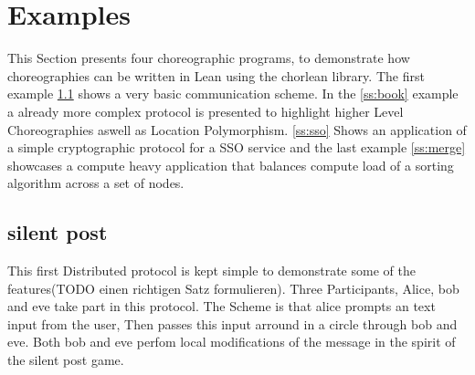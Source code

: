 \begin{lstlisting}[language=lean]
\end{lstlisting}


\section{Examples}

This Section presents four choreographic programs, to demonstrate how choreographies can be written in Lean using the chorlean library. The first example \ref{ss:silent} shows a very basic communication scheme. In the \ref{ss:book} example a already more complex protocol is presented to highlight higher Level Choreographies aswell as Location Polymorphism. \ref{ss:sso} Shows an application of a simple cryptographic protocol for a SSO service and the last example \ref{ss:merge} showcases a compute heavy application that balances compute load of a sorting algorithm across a set of  nodes.

\subsection{silent post}
\label{ss:silent}
This first Distributed protocol is kept simple to demonstrate some of the features(TODO einen richtigen Satz formulieren).
Three Participants, Alice, bob and eve take part in this protocol. The Scheme is that alice prompts an text input from the user, Then passes this input arround in a circle through bob and eve. Both bob and eve perfom local modifications of the message in the spirit of the silent post game.

